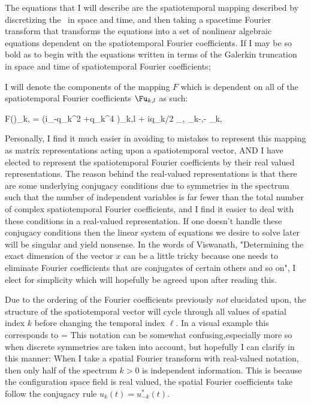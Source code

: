 The equations that I will describe are the spatiotemporal mapping described by discretizing the \KSe\ in
space and time, and then taking a spacetime Fourier transform that transforms the equations into a set
of nonlinear algebraic equations dependent on the spatiotemporal Fourier coefficients.
If I may be so bold as to begin with the equations written in terms of the Galerkin truncation in space and
time of spatiotemporal Fourier coefficients;

I will denote the components of the mapping $F$ which is dependent on all of the spatiotemporal Fourier coefficients $\Fu_{k,l}$
as such:

\beq \label{e-MNGspattemp}
F(\Fu)_{k,\ell} = (i\omega_\ell -q_k^2 +q_k^4 )\Fu_{k,l} + iq_k/2 \sum_{,\prime{\ell}} \Fu_{k-,\ell-\prime{\ell}} \Fu_{k,\ell}
\eeq

Personally, I find it much easier in avoiding to mistakes to represent this mapping as matrix representations acting upon a spatiotemporal vector,
AND I have elected to represent the spatiotemporal Fourier coefficients by their real valued representations. The reason behind the real-valued
representations is that there are some underlying conjugacy conditions due to symmetries in the spectrum
such that the number of independent variables is far fewer than the total number of complex spatiotemporal Fourier coefficients, and I find
it easier to deal with these conditions in a real-valued representation. If one doesn't handle these conjugacy conditions then the linear
system of equations we desire to solve later will be singular and yield nonsense. In the words of Viswanath, "Determining the exact dimension
of the vector $x$ can be a little tricky because one needs to eliminate
Fourier coefficients that are conjugates of certain others and so on", I elect for simplicity which will hopefully be agreed upon after reading this.

Due to the ordering of the Fourier coefficients previously \emph{not} elucidated upon, the structure of the spatiotemporal vector will cycle through
all values of spatial index $k$ before changing the temporal index $\ell$. In a visual example this corresponds to
\beq \label{e-MNGstvec}
\transp{[\Fu_{k,l}]} = \transp{[\Fu_{k,0}, \Fu_{k,1}, \ldots, \Fu_{k,M/2}]}
\eeq
This notation can be somewhat confusing,especially more so when discrete symmetries
are taken into account, but hopefully I can clarify in this manner: When I take a spatial Fourier transform
with real-valued notation, then only half of the spectrum $k > 0$ is independent information. This is because the configuration
space field is real valued, the spatial Fourier coefficients
take follow the conjugacy rule $u_k(t) = u_{-k}^*(t)$.

